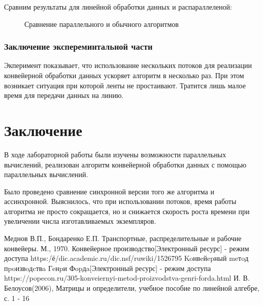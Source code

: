 \documentclass[12pt]{report}
\begin{document}
Сравним результаты для линейной обработки данных и распараллеленой:
\newpage

\begin{figure}
\caption{Сравнение параллельного и обычного алгоритмов} \label{plot:even}
\end{figure}
\par

\newpage
\subsection{Заключение экспереминтальной части}
Экперимент показывает, что использование нескольких потоков для реализации конвейерной обработки данных ускоряет алгоритм в несколько раз. При этом возникает ситуация при которой ленты не простаивают. Тратится лишь малое время для передачи данных на линию.
\chapter*{Заключение}
В ходе лабораторной работы были изучены возможности параллельных вычислений, реализован алгоритм конвейерной обработки данных
с помощью параллельных вычислений.

Было проведено сравнение синхронной версии того же алгоритма и ассинхронной. Выяснилось, что при использовании потоков, время работы алгоритма не просто сокращается, но и снижается скорость роста времени при увеличении числа изготавливаемых экземпляров.

\begin{thebibliography}{3}
 Меднов В.П., Бондаренко Е.П. Транспортные, распределительные и рабочие конвейеры. М., 1970.
 Конвейерное производство[Электронный ресурс] - режим доступа https:/ё/dic.academic.ru/dic.nsf/ruwiki/1526795
 Koнвeйepный meтoд пpoизвoдcтвa Гeнpи Фopдa[Электронный ресурс] - режим доступа https://popecon.ru/305-konveiernyi-metod-proizvodstva-genri-forda.html
 И. В. Белоусов(2006), Матрицы и определители, учебное пособие по линейной алгебре, с. 1 - 16
\end{thebibliography}
\end{document}
